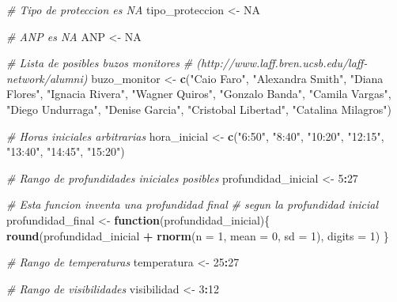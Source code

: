 \documentclass[]{krantz}
\newenvironment{Shaded}{\begin{snugshade}}{\end{snugshade}}
\newcommand{\CommentTok}[1]{\textcolor[rgb]{0.56,0.35,0.01}{\textit{#1}}}
\newcommand{\ControlFlowTok}[1]{\textcolor[rgb]{0.13,0.29,0.53}{\textbf{#1}}}
\newcommand{\DataTypeTok}[1]{\textcolor[rgb]{0.13,0.29,0.53}{#1}}
\newcommand{\DecValTok}[1]{\textcolor[rgb]{0.00,0.00,0.81}{#1}}
\newcommand{\KeywordTok}[1]{\textcolor[rgb]{0.13,0.29,0.53}{\textbf{#1}}}
\newcommand{\NormalTok}[1]{#1}
\newcommand{\OperatorTok}[1]{\textcolor[rgb]{0.81,0.36,0.00}{\textbf{#1}}}
\newcommand{\OtherTok}[1]{\textcolor[rgb]{0.56,0.35,0.01}{#1}}
\newcommand{\StringTok}[1]{\textcolor[rgb]{0.31,0.60,0.02}{#1}}
\begin{document}
\begin{Shaded}
\begin{Highlighting}[]
{\CommentTok{# Tipo de proteccion es NA}
\NormalTok{tipo_proteccion <-}\StringTok{ }\OtherTok{NA}

\CommentTok{# ANP es NA}
\NormalTok{ANP <-}\StringTok{ }\OtherTok{NA}

\CommentTok{# Lista de posibles buzos monitores}
\CommentTok{# (http://www.laff.bren.ucsb.edu/laff-network/alumni)}
\NormalTok{buzo_monitor <-}\StringTok{ }\KeywordTok{c}\NormalTok{(}\StringTok{"Caio Faro"}\NormalTok{,}
                  \StringTok{"Alexandra Smith"}\NormalTok{,}
                  \StringTok{"Diana Flores"}\NormalTok{, }
                  \StringTok{"Ignacia Rivera"}\NormalTok{,}
                  \StringTok{"Wagner Quiros"}\NormalTok{,}
                  \StringTok{"Gonzalo Banda"}\NormalTok{,}
                  \StringTok{"Camila Vargas"}\NormalTok{,}
                  \StringTok{"Diego Undurraga"}\NormalTok{,}
                  \StringTok{"Denise Garcia"}\NormalTok{,}
                  \StringTok{"Cristobal Libertad"}\NormalTok{,}
                  \StringTok{"Catalina Milagros"}\NormalTok{)}

\CommentTok{# Horas iniciales arbitrarias}
\NormalTok{hora_inicial <-}\StringTok{ }\KeywordTok{c}\NormalTok{(}\StringTok{"6:50"}\NormalTok{,}
                  \StringTok{"8:40"}\NormalTok{,}
                  \StringTok{"10:20"}\NormalTok{,}
                  \StringTok{"12:15"}\NormalTok{,}
                  \StringTok{"13:40"}\NormalTok{,}
                  \StringTok{"14:45"}\NormalTok{,}
                  \StringTok{"15:20"}\NormalTok{)}

\CommentTok{# Rango de profundidades iniciales posibles}
\NormalTok{profundidad_inicial <-}\StringTok{ }\DecValTok{5}\OperatorTok{:}\DecValTok{27}

\CommentTok{# Esta funcion inventa una profundidad final}
\CommentTok{# segun la profundidad inicial}
\NormalTok{profundidad_final <-}\StringTok{ }\ControlFlowTok{function}\NormalTok{(profundidad_inicial)\{}
  \KeywordTok{round}\NormalTok{(profundidad_inicial }\OperatorTok{+}\StringTok{ }\KeywordTok{rnorm}\NormalTok{(}\DataTypeTok{n =} \DecValTok{1}\NormalTok{, }\DataTypeTok{mean =} \DecValTok{0}\NormalTok{, }\DataTypeTok{sd =} \DecValTok{1}\NormalTok{),}
        \DataTypeTok{digits =} \DecValTok{1}\NormalTok{)}
\NormalTok{\}}

\CommentTok{# Rango de temperaturas}
\NormalTok{temperatura <-}\StringTok{ }\DecValTok{25}\OperatorTok{:}\DecValTok{27}

\CommentTok{# Rango de visibilidades}
\NormalTok{visibilidad <-}\StringTok{ }\DecValTok{3}\OperatorTok{:}\DecValTok{12}

}
\end{Highlighting}
\end{Shaded}
\end{document}
